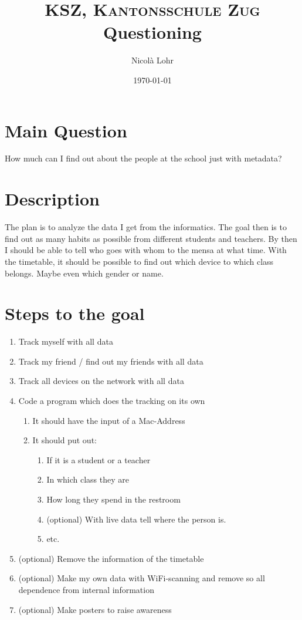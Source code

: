 \documentclass[paper=a4, fontsize=11pt]{scrartcl}
\title{\normalfont \normalsize \textsc{KSZ, Kantonsschule Zug} \\ [25pt]
\huge Questioning \\
}
\author{Nicolà Lohr}
\date{\normalsize\today}
\begin{document}
\maketitle

\section{Main Question}
How much can I find out about the people at the school just with metadata?
\section{Description}

The plan is to analyze the data I get from the informatics. The goal then is to find out as many habits as possible from different students and teachers. By then I should be able to tell who goes with whom to the mensa at what time. With the timetable, it should be possible to find out which device to which class belongs. Maybe even which gender or name. 

\section{Steps to the goal}
\begin{enumerate}
	\item Track myself with all data
	\item Track my friend / find out my friends with all data 
	\item Track all devices on the network with all data
	\item Code a program which does the tracking on its own
	\begin{enumerate}
	\item It should have the input of a Mac-Address
	
	\item It should put out:
	\begin{enumerate}
	\item If it is a student or a teacher
	\item In which class they are
	\item How long they spend in the restroom
	\item (optional) With live data tell where the person is.
	\item etc.
	\end{enumerate}
	\end{enumerate}
	\item (optional) Remove the information of the timetable
	\item (optional) Make my own data with WiFi-scanning and remove so all dependence from internal information
	\item (optional) Make posters to raise awareness
\end{enumerate}
\end{document}
